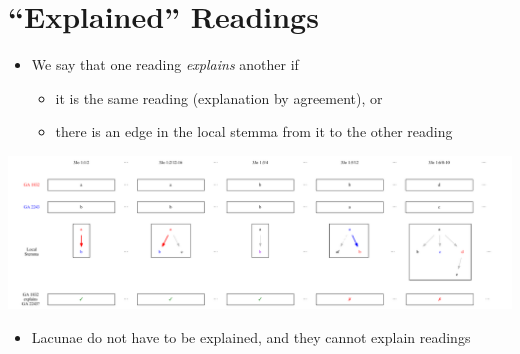 \documentclass[10pt]{beamer}
\begin{document}
	\section*{``Explained'' Readings}
	\begin{frame}
		\begin{itemize}
			\item We say that one reading \emph{explains} another if
			\begin{itemize}
				\item it is the same reading (explanation by agreement), or
				\item there is an edge in the local stemma from it to the other reading
			\end{itemize}
		\end{itemize}
		\begin{center}
			\includegraphics[width=\textwidth]{../img/explained-readings.pdf}
		\end{center}
		\begin{itemize}
			\item Lacunae do not have to be explained, and they cannot explain readings
		\end{itemize}
	\end{frame}
\end{document}

